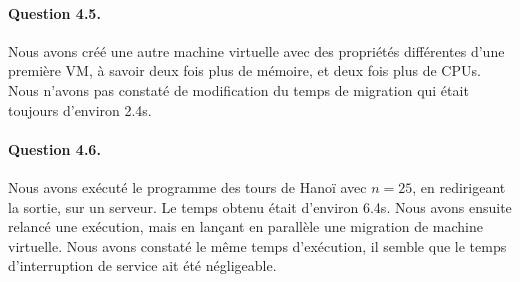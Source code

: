 \documentclass[a4paper]{article}
\begin{document}
\paragraph{Question 4.5.}
Nous avons créé une autre machine virtuelle avec des propriétés différentes d'une première VM, à savoir deux fois plus de mémoire, et deux fois plus de CPUs.
Nous n'avons pas constaté de modification du temps de migration qui était toujours d'environ 2.4s.

\paragraph{Question 4.6.}
Nous avons exécuté le programme des tours de Hanoï avec \(n=25\), en redirigeant la sortie, sur un serveur.
Le temps obtenu était d'environ 6.4s.
Nous avons ensuite relancé une exécution, mais en lançant en parallèle une migration de machine virtuelle.
Nous avons constaté le même temps d'exécution, il semble que le temps d'interruption de service ait été négligeable.
\end{document}
